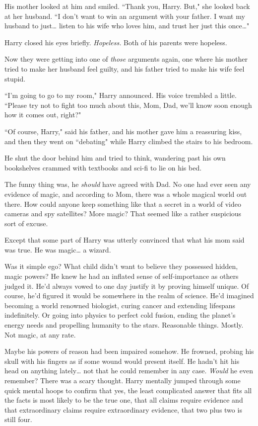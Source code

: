 His mother looked at him and smiled. ``Thank you, Harry. But," she looked back at her husband. ``I don't want to win an argument with your father. I want my husband to just{\ldots} listen to his wife who loves him, and trust her just this once{\ldots}"

Harry closed his eyes briefly. \emph{Hopeless.} Both of his parents were hopeless.

Now they were getting into one of \emph{those} arguments again, one where his mother tried to make her husband feel guilty, and his father tried to make his wife feel stupid.

``I'm going to go to my room," Harry announced. His voice trembled a little. ``Please try not to fight too much about this, Mom, Dad, we'll know soon enough how it comes out, right?"

``Of course, Harry," said his father, and his mother gave him a reassuring kiss, and then they went on ``debating" while Harry climbed the stairs to his bedroom.

He shut the door behind him and tried to think, wandering past his own bookshelves crammed with textbooks and sci-fi to lie on his bed.

The funny thing was, he \emph{should} have agreed with Dad. No one had ever seen any evidence of magic, and according to Mom, there was a whole magical world out there. How could anyone keep something like that a secret in a world of video cameras and spy satellites? More magic? That seemed like a rather suspicious sort of excuse.

Except that some part of Harry was utterly convinced that what his mom said was true. He was magic{\ldots} a wizard.

Was it simple ego? What child didn't want to believe they possessed hidden, magic powers? He knew he had an inflated sense of self-importance as others judged it. He'd always vowed to one day justify it by proving himself unique. Of course, he'd figured it would be somewhere in the realm of science. He'd imagined becoming a world renowned biologist, curing cancer and extending lifespans indefinitely. Or going into physics to perfect cold fusion, ending the planet's energy needs and propelling humanity to the stars. Reasonable things. Mostly. Not magic, at any rate.

Maybe his powers of reason had been impaired somehow. He frowned, probing his skull with his fingers as if some wound would present itself. He hadn't hit his head on anything lately{\ldots} not that he could remember in any case. \emph{Would} he even remember? There was a scary thought. Harry mentally jumped through some quick mental hoops to confirm that yes, the least complicated answer that fits all the facts is most likely to be the true one, that all claims require evidence and that extraordinary claims require extraordinary evidence, that two plus two is still four.

